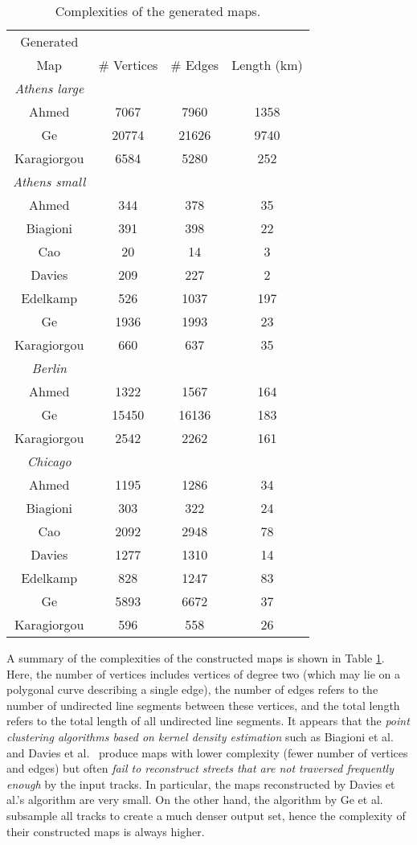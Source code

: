 \documentclass[natbib]{svjour3}                    \smartqed  \usepackage[table]{xcolor}
\begin{document}
\begin{table}[htbp]\scriptsize
\centering
\begin{tabular}{|c||c c c|}
\hline
Generated&&&\\
Map&\# Vertices&\# Edges& Length (km)\\
\hline
\hline
\emph{Athens large}&&&\\
\hline
Ahmed&7067&7960&1358\\
Ge&20774&21626&9740\\
Karagiorgou&6584&5280&252\\
\hline
\emph{Athens small}&&&\\
\hline
Ahmed&344&378&35\\
Biagioni&391&398&22\\
Cao&20&14&3\\
Davies&209&227&2\\
Edelkamp&526&1037&197\\
Ge&1936&1993&23\\
Karagiorgou&660&637&35\\
\hline
\emph{Berlin}&&&\\
\hline
Ahmed&1322&1567&164\\
Ge&15450&16136&183\\
Karagiorgou&2542&2262&161\\
\hline
\emph{Chicago}&&&\\
\hline
Ahmed&1195&1286&34\\
Biagioni&303&322&24\\
Cao&2092&2948&78\\
Davies&1277&1310&14\\
Edelkamp&828&1247&83\\
Ge&5893&6672&37\\
Karagiorgou&596&558&26\\
\hline
\end{tabular}
\caption{Complexities of the generated maps.}
\label{tab:tab_stat}
\end{table}

A summary of the complexities of the constructed maps is shown in Table \ref{tab:tab_stat}. Here, the number of vertices includes vertices of degree two (which may lie on a polygonal curve describing a single edge), the number of edges refers to the number of undirected line segments between these vertices, and the total length refers to the total length of all undirected line segments.
It appears that the \emph{point clustering algorithms based on kernel density estimation} such as Biagioni et al.\ \cite{be-irmgp-12,Biagioni:2012:MIF:2424321.2424333} and Davies et al.\ \cite{Davies:2006:SDR:1175887.1176088} produce maps with lower complexity (fewer number of vertices and edges) but often \emph{fail to reconstruct streets that are not traversed frequently enough} by the input tracks. 
In particular, the maps reconstructed by Davies et al.'s algorithm are very small. 
On the other hand, the algorithm by Ge et al.\ \cite{DBLP:conf/nips/GeSBW11} subsample all tracks to create a much denser output set, hence the complexity of their constructed maps is always higher.
\end{document}
